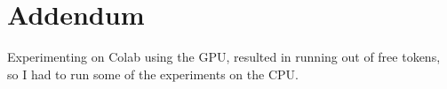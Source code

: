 \documentclass[8pt,a4paper]{report}%
\begin{document}

\section*{Addendum}

Experimenting on Colab using the GPU, resulted in running out of free tokens, so I had to run some of the experiments on the CPU.

% 
%

\clearpage %
\nocite{*}
{} %
\begingroup %
\footnotesize %


\endgroup %
\end{document}
